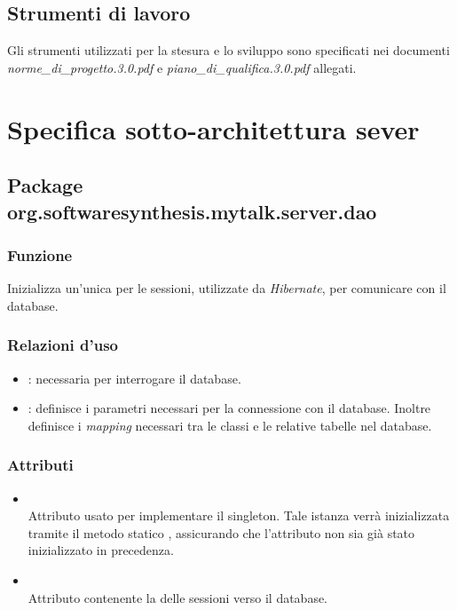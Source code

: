 \subsection{Strumenti di lavoro}
Gli strumenti utilizzati per la stesura e lo sviluppo sono specificati nei documenti \textit{norme\_di\_progetto.3.0.pdf} e \textit{piano\_di\_qualifica.3.0.pdf} allegati.

\clearpage

\section{Specifica sotto-architettura sever}\label{sec:serverarchitecture}

\subsection{Package org.softwaresynthesis.mytalk.server.dao}\label{sec:dao}


\subsubsection*{Funzione}
Inizializza un'unica  per le sessioni, utilizzate da \textit{Hibernate}, per comunicare con il database.

\subsubsection*{Relazioni d'uso}

\begin{itemize}
	\item {}: necessaria per interrogare il database.
	\item {}: definisce i parametri necessari per la connessione con il database. Inoltre definisce i \textit{mapping} necessari tra le classi  e le relative tabelle nel database.
\end{itemize}

\subsubsection*{Attributi}

\begin{itemize}
	\item{}\\
	Attributo usato per implementare il  singleton. Tale istanza verrà inizializzata tramite il metodo statico , assicurando che l'attributo non sia già stato inizializzato in precedenza.
	\item{}\\
	Attributo contenente la  delle sessioni verso il database.
\end{itemize}

